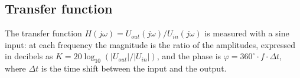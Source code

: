 \subsection{Transfer function}\label{sec:th_transfer}
The transfer function $H(j\omega) = U_{out}(j\omega)/U_{in}(j\omega)$ is measured with a sine input: at each frequency the magnitude is the ratio of the amplitudes, expressed in decibels as $K = 20\log_{10}(|U_{out}|/|U_{in}|)$, and the phase is $\varphi = 360^\circ \cdot f \cdot \Delta t$, where $\Delta t$ is the time shift between the input and the output.
